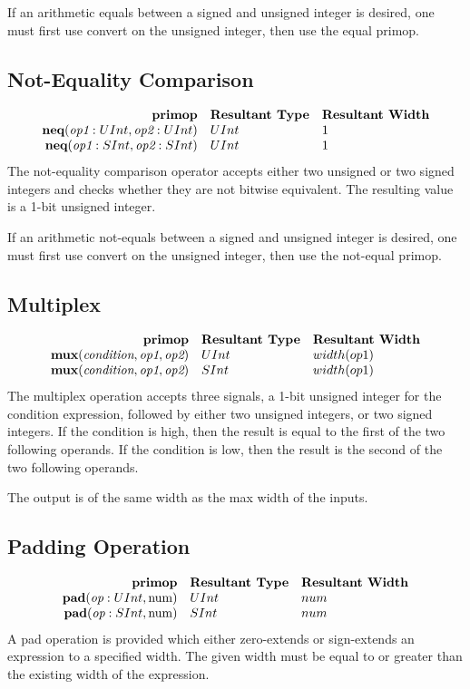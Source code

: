 \documentclass[12pt]{article}
\begin{document}
If an arithmetic equals between a signed and unsigned integer is desired, one must first use convert on the unsigned integer, then use the equal primop.

\subsection{Not-Equality Comparison}
\[
\begin{array}{rll}
\text{\bf primop} & \text{\bf Resultant Type} & \text{\bf Resultant Width} \\
\text{\bf neq}(\text{\em op1}:UInt, \text{\em op2}:UInt)     & UInt & 1 \\
\text{\bf neq}(\text{\em op1}:SInt, \text{\em op2}:SInt)     & UInt & 1 \\
\end{array}
\]
The not-equality comparison operator accepts either two unsigned or two signed integers and checks whether they are not bitwise equivalent.
The resulting value is a 1-bit unsigned integer. 

If an arithmetic not-equals between a signed and unsigned integer is desired, one must first use convert on the unsigned integer, then use the not-equal primop.

\subsection{Multiplex}
\[
\begin{array}{rll}
\text{\bf primop} & \text{\bf Resultant Type} & \text{\bf Resultant Width} \\
\text{\bf mux}  (\text{\em condition}, \text{\em op1}, \text{\em op2}) & UInt & width(op1) \\
\text{\bf mux}  (\text{\em condition}, \text{\em op1}, \text{\em op2}) & SInt & width(op1) \\
\end{array}
\]
The multiplex operation accepts three signals, a 1-bit unsigned integer for the condition expression, followed by either two unsigned integers, or two signed integers.
If the condition is high, then the result is equal to the first of the two following operands.
If the condition is low, then the result is the second of the two following operands. 

The output is of the same width as the max width of the inputs.

\subsection{Padding Operation}
\[
\begin{array}{rll}
\text{\bf primop} & \text{\bf Resultant Type} & \text{\bf Resultant Width} \\
\text{\bf pad}(\text{\em op}:UInt, \text{num})     & UInt & num \\
\text{\bf pad}(\text{\em op}:SInt, \text{num})     & SInt & num \\
\end{array}
\]
A pad operation is provided which either zero-extends or sign-extends an expression to a specified width.
The given width must be equal to or greater than the existing width of the expression. 
\end{document}
